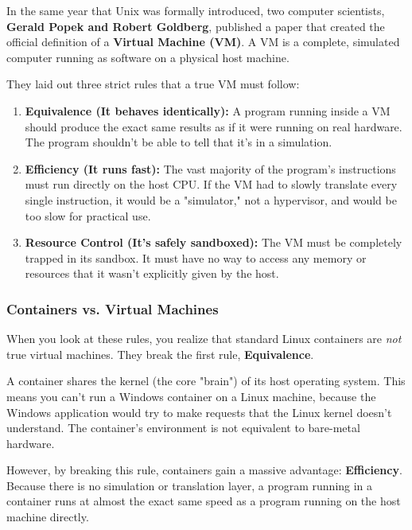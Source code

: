 In the same year that Unix was formally introduced, two computer scientists, \textbf{Gerald Popek and Robert Goldberg}, published a paper that created the official definition of a \textbf{Virtual Machine (VM)}. A VM is a complete, simulated computer running as software on a physical host machine.

They laid out three strict rules that a true VM must follow:

\begin{enumerate}
\item \textbf{Equivalence (It behaves identically):} A program running inside a VM should produce the exact same results as if it were running on real hardware. The program shouldn't be able to tell that it's in a simulation.
\item \textbf{Efficiency (It runs fast):} The vast majority of the program's instructions must run directly on the host CPU. If the VM had to slowly translate every single instruction, it would be a "simulator," not a hypervisor, and would be too slow for practical use.
\item \textbf{Resource Control (It's safely sandboxed):} The VM must be completely trapped in its sandbox. It must have no way to access any memory or resources that it wasn't explicitly given by the host.
\end{enumerate}

\subsubsection{\textbf{Containers vs. Virtual Machines}}


When you look at these rules, you realize that standard Linux containers are \textit{not} true virtual machines. They break the first rule, \textbf{Equivalence}.

A container shares the kernel (the core "brain") of its host operating system. This means you can't run a Windows container on a Linux machine, because the Windows application would try to make requests that the Linux kernel doesn't understand. The container's environment is not equivalent to bare-metal hardware.

However, by breaking this rule, containers gain a massive advantage: \textbf{Efficiency}. Because there is no simulation or translation layer, a program running in a container runs at almost the exact same speed as a program running on the host machine directly.

